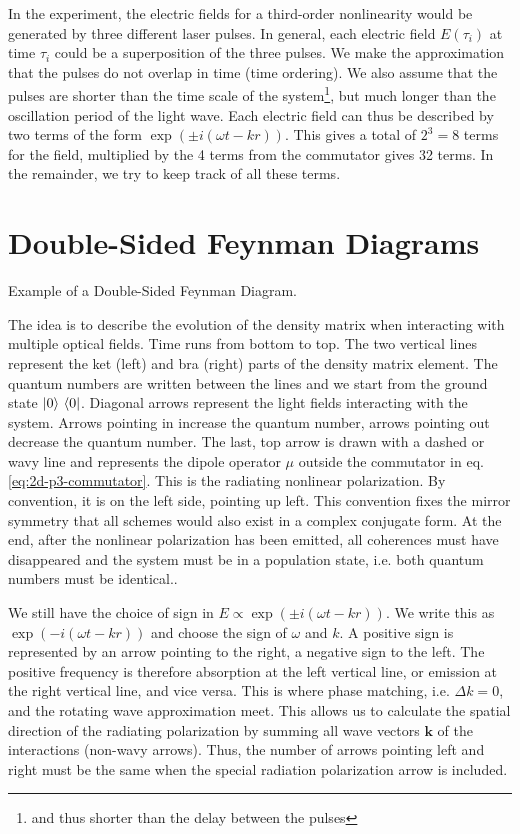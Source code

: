 In the experiment, the electric fields for a third-order nonlinearity would be generated by three different laser pulses. In general, each electric field $E(\tau_i)$ at time $\tau_i$ could be a superposition of the three pulses. We make the approximation that the pulses do not overlap in time (time ordering). We also assume that the pulses are shorter than the time scale of the system\footnote{and thus shorter than the delay between the pulses}, but much longer than the oscillation period of the light wave. Each electric field can thus be described by two terms of the form $\exp( \pm i (\omega t - k r) )$. This gives a total of $2^3=8$ terms for the field, multiplied by the 4 terms from the commutator gives 32 terms.
In the remainder, we try to keep track of all these terms.



\section{Double-Sided Feynman Diagrams}

\begin{marginfigure}
\caption{
Example of a Double-Sided Feynman Diagram.}
\label{fig:2d_example_feynman}
\end{marginfigure}

The idea is to describe the evolution of the density matrix when interacting with multiple optical fields.
Time runs from bottom to top. The two vertical lines represent the ket (left) and bra (right) parts of the density matrix element. The quantum numbers are written between the lines and we start from the ground state $\ket{0}\, \bra{0}$. Diagonal arrows represent the light fields interacting with the system. Arrows pointing in increase the quantum number, arrows pointing out decrease the quantum number. The last, top arrow is drawn with a dashed or wavy line and represents the dipole operator $\mu$ outside the commutator in eq. \ref{eq:2d-p3-commutator}. This is the radiating nonlinear polarization. By convention, it is on the left side, pointing up left. This convention fixes the mirror symmetry that all schemes would also exist in a complex conjugate form. At the end, after the nonlinear polarization has been emitted, all coherences must have disappeared and the system must be in a population state, i.e. both quantum numbers must be identical..



We still have the choice of sign in $E \propto \exp( \pm i (\omega t - k r) )$. We write this as $\exp(- i (\omega t - k r) )$ and choose the sign of $\omega$ and $k$.
A positive sign is represented by an arrow pointing to the right, a negative sign to the left. The positive frequency is therefore absorption at the left vertical line, or emission at the right vertical line, and vice versa. This is where phase matching, i.e. $\Delta k = 0$, and the rotating wave approximation meet. This allows us to calculate the spatial direction of the radiating polarization by summing all wave vectors $\mathbf{k}$ of the interactions (non-wavy arrows).
Thus, the number of arrows pointing left and right must be the same when the special radiation polarization arrow is included.

